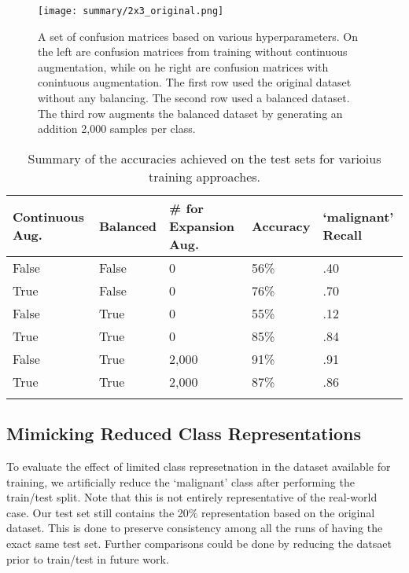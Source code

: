 \documentclass[sn-mathphys,Numbered]{sn-jnl}%
\theoremstyle{thmstyleone}%
\theoremstyle{thmstyletwo}%
\theoremstyle{thmstylethree}%
\begin{document}
\begin{figure}[!htbp]
    \centering

    \texttt{[image: summary/2x3\_original.png]}

    \caption{A set of confusion matrices based on various hyperparameters.  On the left are confusion matrices from training without continuous augmentation, while on he right are confusion matrices with conintuous augmentation.  The first row used the original dataset without any balancing.  The second row used a balanced dataset.  The third row augments the balanced dataset by generating an addition 2,000 samples per class.}
    \label{fig:2x3_original}
\end{figure}



\begin{table}[h]
\caption{Summary of the accuracies achieved on the test sets for varioius training approaches.}\label{dataaccuraces}
\begin{tabular}{@{}lllll@{}}%
\toprule
Continuous Aug. & Balanced & \# for Expansion Aug.  & Accuracy & `malignant' Recall\\
\midrule
False & False & 0 & 56\% & .40 \\
True & False & 0 & 76\% & .70 \\
False & True & 0 & 55\% & .12 \\
True & True & 0 & 85\% & .84 \\
False & True & 2,000 & 91\% & .91 \\
True & True & 2,000 & 87\% & .86 \\
\botrule
\end{tabular}
\end{table}



\subsection{Mimicking Reduced Class Representations}\label{sectraining_reductions}
To evaluate the effect of limited class represetnation in the dataset available for training, we artificially reduce the `malignant' class after performing the train/test split.  Note that this is not entirely representative of the real-world case.  Our test set still contains the 20\% representation based on the original dataset.  This is done to preserve consistency among all the runs of having the exact same test set.  Further comparisons could be done by reducing the datsaet prior to train/test in future work.
\end{document}
